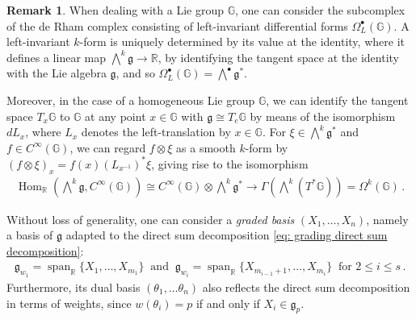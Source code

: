\documentclass[dvipsnames]{amsart}
\theoremstyle{definition}
\newtheorem{remark}[theorem]{Remark}
\theoremstyle{definition}
\numberwithin{equation}{section}
\newcommand{\R}{\mathbb{R}}
\newcommand{\G}{\mathbb{G}}
\begin{document}
\begin{remark}
    When dealing with a Lie group $\G$, one can consider the subcomplex of the de Rham complex consisting of left-invariant differential forms $\Omega^\bullet_L(\G)$. A left-invariant $k$-form is uniquely determined by its value at the identity, where it defines a linear map $\bigwedge^k\mathfrak{g}\to\R$, by identifying the tangent space at the identity with the Lie algebra $\mathfrak{g}$, and so $\Omega^\bullet_L(\G)=\bigwedge^\bullet\mathfrak{g}^\ast$.

    Moreover, in the case of a homogeneous Lie group $\G$, we can identify the tangent space $T_x\G$ to $\G$ at any point $x\in\G$ with $\mathfrak{g}\cong T_e\G$ by means of the isomorphism $dL_x$, where $L_x$ denotes the left-translation by $x\in\G$. For $\xi\in\bigwedge^k\mathfrak{g}^\ast$ and $f\in C^\infty(\G)$, we can regard $f\otimes\xi$ as a smooth $k$-form by $(f\otimes\xi)_x=f(x)(L_{x^{-1}})^*\xi$, giving rise to the isomorphism
    \begin{align*}
        \operatorname{Hom}_\R\left(\bigwedge\nolimits^k\mathfrak{g},C^\infty(\G)\right)\cong C^\infty(\G)\otimes\bigwedge\nolimits^k\mathfrak{g}^\ast\to\Gamma\left(\bigwedge\nolimits^k(T^*\G)\right)=\Omega^k(\G)\,.
    \end{align*}
\end{remark}
Without loss of generality, {one can consider a \textit{graded basis} $(X_1,\ldots,X_n)$, namely a basis of $\mathfrak g$ adapted to the direct sum decomposition \eqref{eq: grading direct sum decomposition}: } 
\begin{align*}
    \mathfrak{g}_{w_1}=\operatorname{span}_\R\{X_1,\ldots,X_{m_1}\}\ \text{ and }\ \mathfrak{g}_{w_i}=\operatorname{span}_\R\{X_{m_{i-1}+1},\ldots,X_{m_i}\}\ \text{ for }2\le i\le s\,.
\end{align*}
Furthermore, its dual basis $(\theta_1,\ldots\theta_n)$ also reflects the direct sum decomposition in terms of weights, since $w(\theta_i)=p$ if and only if $X_i\in\mathfrak{g}_{p}$.
\end{document}

